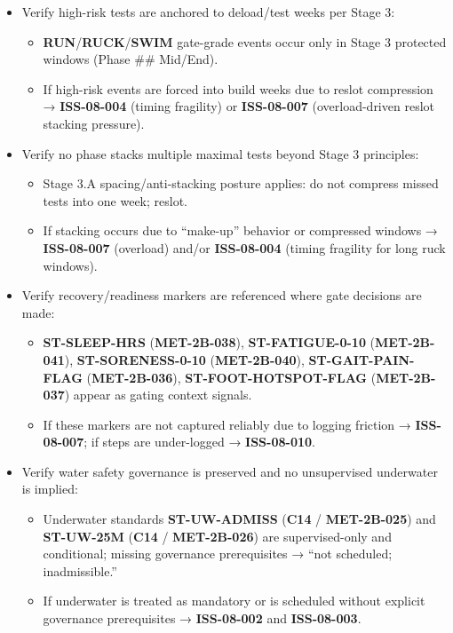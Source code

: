 \documentclass[10pt]{article}
\begin{document}
\begin{itemize}
\item Verify high-risk tests are anchored to deload/test weeks per Stage 3:
  \begin{itemize}
  \item \textbf{RUN}/\textbf{RUCK}/\textbf{SWIM} gate-grade events occur only in Stage 3 protected windows (Phase \#\# Mid/End).
  \item If high-risk events are forced into build weeks due to reslot compression → \textbf{ISS-08-004} (timing fragility) or \textbf{ISS-08-007} (overload-driven reslot stacking pressure).
  \end{itemize}

\item Verify no phase stacks multiple maximal tests beyond Stage 3 principles:
  \begin{itemize}
  \item Stage 3.A spacing/anti-stacking posture applies: do not compress missed tests into one week; reslot.
  \item If stacking occurs due to “make-up” behavior or compressed windows → \textbf{ISS-08-007} (overload) and/or \textbf{ISS-08-004} (timing fragility for long ruck windows).
  \end{itemize}

\item Verify recovery/readiness markers are referenced where gate decisions are made:
  \begin{itemize}
  \item \textbf{ST-SLEEP-HRS} (\textbf{MET-2B-038}), \textbf{ST-FATIGUE-0-10} (\textbf{MET-2B-041}), \textbf{ST-SORENESS-0-10} (\textbf{MET-2B-040}), \textbf{ST-GAIT-PAIN-FLAG} (\textbf{MET-2B-036}), \textbf{ST-FOOT-HOTSPOT-FLAG} (\textbf{MET-2B-037}) appear as gating context signals.
  \item If these markers are not captured reliably due to logging friction → \textbf{ISS-08-007}; if steps are under-logged → \textbf{ISS-08-010}.
  \end{itemize}

\item Verify water safety governance is preserved and no unsupervised underwater is implied:
  \begin{itemize}
  \item Underwater standards \textbf{ST-UW-ADMISS} (\textbf{C14} / \textbf{MET-2B-025}) and \textbf{ST-UW-25M} (\textbf{C14} / \textbf{MET-2B-026}) are supervised-only and conditional; missing governance prerequisites → “not scheduled; inadmissible.”
  \item If underwater is treated as mandatory or is scheduled without explicit governance prerequisites → \textbf{ISS-08-002} and \textbf{ISS-08-003}.
  \end{itemize}
\end{itemize}
\end{document}
